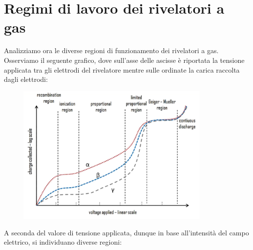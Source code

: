 \section{Regimi di lavoro dei rivelatori a gas}

Analizziamo ora le diverse regioni di funzionamento dei rivelatori a gas. Osserviamo il seguente grafico, dove sull'asse delle ascisse è riportata la tensione applicata tra gli elettrodi del rivelatore mentre sulle ordinate la carica raccolta dagli elettrodi:

\begin{figure}[H]
   \centering
   \includegraphics[width=0.85\textwidth]{immagini/regimi_rivelatori_a_gas.png}
\end{figure}

A seconda del valore di tensione applicata, dunque in base all'intensità del campo elettrico, si individuano diverse regioni:


